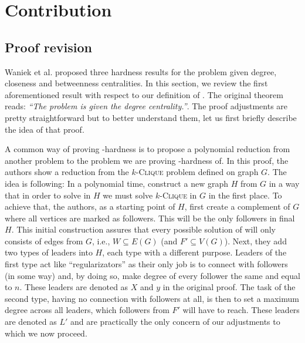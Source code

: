\chapter{Contribution}\label{chapter:contribution}



\section{Proof revision}\label{section:proofRevision}

Waniek et al. \cite{Waniek2017} proposed three hardness results for the \HL problem given degree, closeness and betweenness
centralities. In this section, we review the first aforementioned result with respect to our definition of \HLshort.
The original theorem reads: \emph{``The \HL problem is \NPc given the degree centrality.''}.
The proof adjustments are pretty straightforward but to better understand them,
let us first briefly describe the idea of that proof.

A common way of proving \NP-hardness is to propose a polynomial reduction from another \NPh problem to the
problem we are proving \NP-hardness of.
In this proof, the authors show a reduction from the $k$-\textsc{Clique} problem defined on graph $G$.
The idea is following: In a polynomial time, construct a new graph $H$ from $G$ in a way that
in order to solve \HL in $H$ we must solve $k$-\textsc{Clique} in $G$ in the first place.
To achieve that, the authors, as a starting point of $H$, first create a complement of $G$ 
where all vertices are marked as followers. This will be the only followers in final $H$.
This initial construction assures that every possible solution of \HLshort will only consists of edges from $G$, i.e.,
$W \subseteq E(G)$ (and $F' \subseteq V(G)$).
Next, they add two types of leaders into $H$, each type with a different purpose.
Leaders of the first type act like ``regularizators'' as their only job is to connect with followers (in some way) and,
by doing so, make degree of every follower the same and equal to $n$.
These leaders are denoted as $X$ and $y$ in the original proof.
The task of the second type, having no connection with followers at all,
is then to set a maximum degree across all leaders, which followers from $F'$ will have to reach.
These leaders are denoted as $L'$ and are practically the only concern of our adjustments to which we now proceed.

